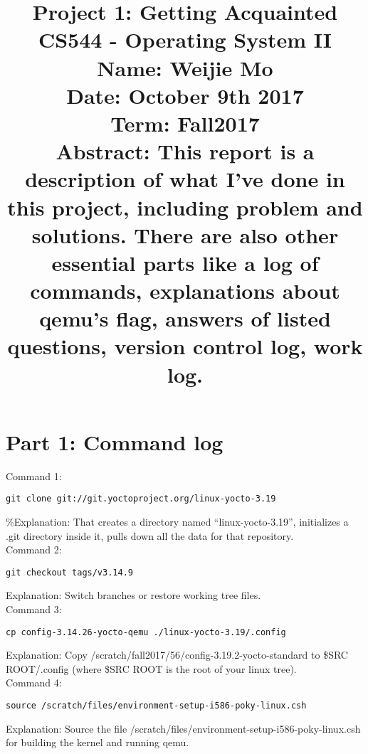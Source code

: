 \documentclass[10pt,draftclsnofoot,peerreview,letterpaper,onecolumn,]{IEEEtran}
\begin{document}
\break
\break
\break
\break
\break
\title{
\textbf{Project 1: Getting Acquainted}\\
\hfill \break
\hfill \break
\hfill \break
\hfill \break
\hfill \break
\large{CS544 - Operating System II\\
\hfill \break
Name: Weijie Mo\\
\hfill \break
Date: October 9th 2017\\
\hfill \break
Term: Fall2017\\
\hfill \break
}
\hfill \break
\hfill \break
\hfill \break
\hfill \break
\hfill \break
\large{Abstract:
This report is a description of what I've done in this project, including problem and solutions. There are also other essential parts like a log of commands, explanations about qemu's flag, answers of listed questions, version control log, work log.
}
}

\IEEEpeerreviewmaketitle{ }

\newpage

\section{Part 1: Command log}
Command 1:
\begin{verbatim}
git clone git://git.yoctoproject.org/linux-yocto-3.19
\end{verbatim}
\%Explanation: That creates a directory named “linux-yocto-3.19”, initializes a .git directory inside it, pulls down all the data for that repository.\\


Command 2:
\begin{verbatim}
git checkout tags/v3.14.9
\end{verbatim}
Explanation: Switch branches or restore working tree files.\\

Command 3:
\begin{verbatim}
cp config-3.14.26-yocto-qemu ./linux-yocto-3.19/.config
\end{verbatim}
Explanation: Copy /scratch/fall2017/56/config-3.19.2-yocto-standard to \$SRC ROOT/.config (where \$SRC ROOT is the root of your linux tree).\\

Command 4:
\begin{verbatim}
source /scratch/files/environment-setup-i586-poky-linux.csh
\end{verbatim}
Explanation: Source the file /scratch/files/environment-setup-i586-poky-linux.csh for building the kernel and running qemu.\\
\end{document}
